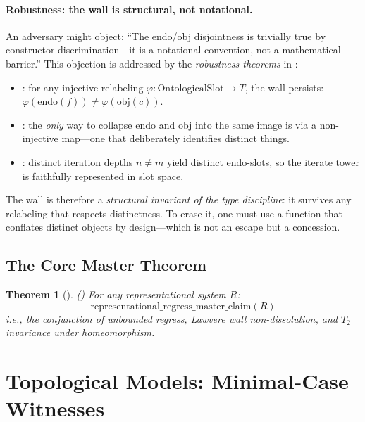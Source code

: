 \documentclass[11pt]{article}
\newtheorem{theorem}{Theorem}[section]
\begin{document}
\paragraph{Robustness: the wall is structural, not notational.}
An adversary might object: ``The endo/obj disjointness is trivially
true by constructor discrimination---it is a notational convention,
not a mathematical barrier.''  This objection is addressed by the
\emph{robustness theorems} in :
\begin{itemize}[leftmargin=1.5em,itemsep=0.15ex,topsep=0.4ex,parsep=0pt]
\item {}: for any
  injective relabeling $\varphi : \mathrm{OntologicalSlot} \to T$,
  the wall persists: $\varphi(\mathrm{endo}(f)) \neq \varphi(\mathrm{obj}(c))$.
\item {}:
  the \emph{only} way to collapse endo and obj into the same image is
  via a non-injective map---one that deliberately identifies distinct things.
\item {}: distinct
  iteration depths $n \neq m$ yield distinct endo-slots, so the iterate
  tower is faithfully represented in slot space.
\end{itemize}
The wall is therefore a \emph{structural invariant of the type
discipline}:  it survives any relabeling that respects distinctness.
To erase it, one must use a function that conflates distinct objects
by design---which is not an escape but a concession.

\subsection{The Core Master Theorem}

\begin{theorem}[]
\label{thm:master}
() For any representational system $R$:
\[
  \mathrm{representational\_regress\_master\_claim}(R)
\]
i.e., the conjunction of unbounded regress, Lawvere wall non-dissolution, and $T_2$ invariance under homeomorphism.
\end{theorem}

\section{Topological Models: Minimal-Case Witnesses}
\label{sec:models}
\end{document}
